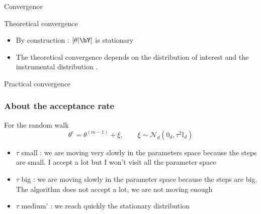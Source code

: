  \begin{frame}{Convergence}
 \begin{block}{Theoretical convergence }
 \begin{itemize}
  \item By construction : $[\theta | \bY]$ is stationary
  \item The theoretical convergence depends on the distribution of interest and the instrumental distribution  . \color{dgreen}  \cite{robert1999monte} \color{black}
\end{itemize}
\end{block}
\begin{block}{Practical convergence}
  
\end{block}
\end{frame}


 




  

\begin{frame}[fragile]\frametitle{About the acceptance rate}
 
 
 For the random walk
 $$ \theta^{c}  = \theta^{(m-1)} + \xi, \quad \quad \xi\sim \mathcal{N}_d(0_d, \tau^2 \mathbb{I}_d)$$
 

\begin{itemize}
\item $\tau$ small : we are moving very slowly in the parameters space because the steps are small. I accept a lot but I won't visit all the parameter space
\item $\tau$  big : we are moving slowly in the parameter space because the steps are big. The algorithm does not accept a lot, we are not moving enough 
\item $\tau$ medium' : we reach quickly the stationary distribution 
% 
\end{itemize}
\end{frame}




